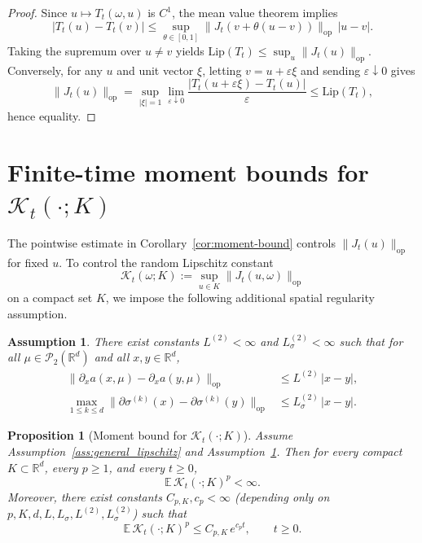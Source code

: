 \documentclass{tsp-short}
\newtheorem{assumption}{Assumption}
\newtheorem{proposition}{Proposition}[section]
\theoremstyle{remark}
\theoremstyle{definition}
\begin{document}
\begin{proof}
Since $u\mapsto T_t(\omega,u)$ is $C^1$, the mean value theorem implies
\begin{equation*}
|T_t(u)-T_t(v)| \le \sup_{\theta\in[0,1]}\|J_t(v+\theta(u-v))\|_{\mathrm{op}}\,|u-v|.
\end{equation*}
Taking the supremum over $u\neq v$ yields $\mathrm{Lip}(T_t)\le \sup_u\|J_t(u)\|_{\mathrm{op}}$.
Conversely, for any $u$ and unit vector $\xi$, letting $v=u+\varepsilon\xi$ and sending $\varepsilon\downarrow 0$ gives
\begin{equation*}
\|J_t(u)\|_{\mathrm{op}} = \sup_{|\xi|=1}\lim_{\varepsilon\downarrow 0}\frac{|T_t(u+\varepsilon\xi)-T_t(u)|}{\varepsilon}
\le \mathrm{Lip}(T_t),
\end{equation*}
hence equality.
\end{proof}



\section{Finite-time moment bounds for $\mathcal{K}_t(\cdot;K)$}\label{sec:Kt-moment} 

The pointwise estimate in Corollary~\ref{cor:moment-bound} controls $\|J_t(u)\|_{\mathrm{op}}$ for fixed $u$. To control the random Lipschitz constant
\begin{equation}
\mathcal{K}_t(\omega;K):=\sup_{u\in K}\|J_t(u,\omega)\|_{\mathrm{op}}
\end{equation}
on a compact set $K$, we impose the following additional spatial regularity assumption. \begin{assumption}\label{ass:spatial-lip-derivatives} There exist constants $L^{(2)}<\infty$ and $L_\sigma^{(2)}<\infty$ such that for all $\mu\in\mathcal{P}_2(\mathbb{R}^d)$ and all $x,y\in\mathbb{R}^d$, \begin{align*} \|\partial_x a(x,\mu)-\partial_x a(y,\mu)\|_{\mathrm{op}} &\le L^{(2)}\,|x-y|,\\ \max_{1\le k\le d}\|\partial \sigma^{(k)}(x)-\partial \sigma^{(k)}(y)\|_{\mathrm{op}} &\le L_\sigma^{(2)}\,|x-y|. \end{align*} \end{assumption} \begin{proposition}[Moment bound for $\mathcal{K}_t(\cdot;K)$]\label{prop:Kt-moment} Assume Assumption~\ref{ass:general_lipschitz} and Assumption~\ref{ass:spatial-lip-derivatives}. Then for every compact $K\subset\mathbb{R}^d$, every $p\ge 1$, and every $t\ge0$, \begin{equation}\label{eq:Kt-finite-moment} \mathbb{E}\,\mathcal{K}_t(\cdot;K)^p<\infty. \end{equation} Moreover, there exist constants $C_{p,K},c_p<\infty$ (depending only on $p,K,d,L,L_\sigma,L^{(2)},L_\sigma^{(2)}$) such that \begin{equation}\label{eq:Kt-exp-growth} \mathbb{E}\,\mathcal{K}_t(\cdot;K)^p \le C_{p,K}\,e^{c_p t}, \qquad t\ge0. \end{equation} \end{proposition}
\end{document}
